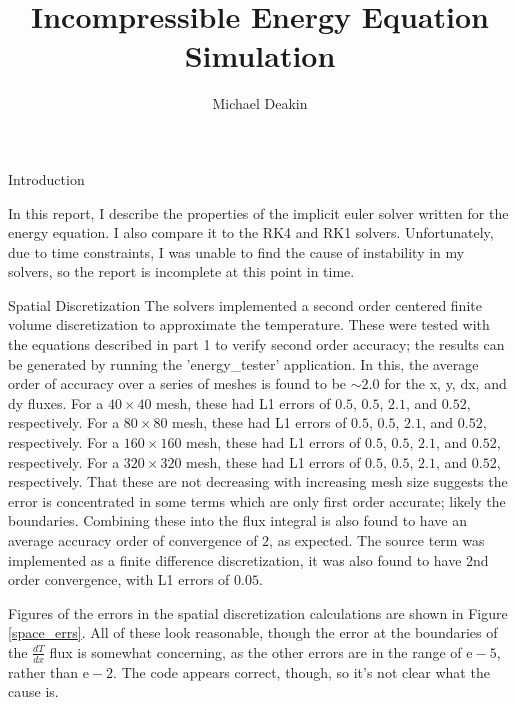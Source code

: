 \documentclass{article}
\title{Incompressible Energy Equation Simulation}
\author{Michael Deakin}
\begin{document}
\maketitle

\begin{section}{Introduction}

In this report, I describe the properties of the implicit euler solver written for the energy equation.
I also compare it to the RK4 and RK1 solvers.
Unfortunately, due to time constraints, I was unable to find the cause of instability in my solvers, so the report is incomplete at this point in time.
\end{section}

\begin{section}{Spatial Discretization}
The solvers implemented a second order centered finite volume discretization to approximate the temperature.
These were tested with the equations described in part 1 to verify second order accuracy;
the results can be generated by running the 'energy\_tester' application. In this, the average order of accuracy over a series of meshes is found to be $\sim 2.0$ for the x, y, dx, and dy fluxes.
For a $40 \times 40$ mesh, these had L1 errors of $0.5$, $0.5$, $2.1$, and $0.52$, respectively.
For a $80 \times 80$ mesh, these had L1 errors of $0.5$, $0.5$, $2.1$, and $0.52$, respectively.
For a $160 \times 160$ mesh, these had L1 errors of $0.5$, $0.5$, $2.1$, and $0.52$, respectively.
For a $320 \times 320$ mesh, these had L1 errors of $0.5$, $0.5$, $2.1$, and $0.52$, respectively.
That these are not decreasing with increasing mesh size suggests the error is concentrated in some terms which are only first order accurate; likely the boundaries.
Combining these into the flux integral is also found to have an average accuracy order of convergence of $2$, as expected.
The source term was implemented as a finite difference discretization,
it was also found to have 2nd order convergence, with L1 errors of $0.05$.

Figures of the errors in the spatial discretization calculations are shown in Figure \ref{space_errs}.
All of these look reasonable, though the error at the boundaries of the $\frac{dT}{dx}$ flux is somewhat concerning,
as the other errors are in the range of $\text{e}-5$, rather than $\text{e}-2$.
The code appears correct, though, so it's not clear what the cause is.


\end{section}
\end{document}
